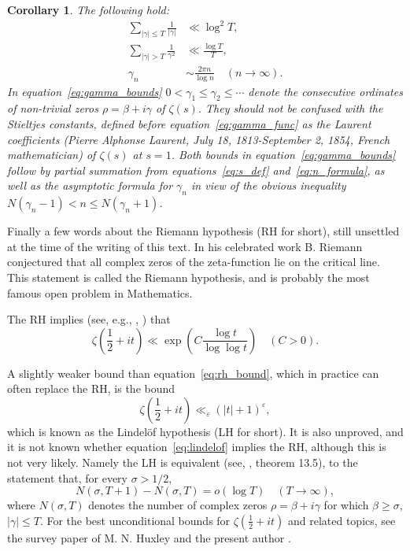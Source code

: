 \documentclass[11pt]{article}
\newtheorem{corollary}[theorem]{Corollary}
\begin{document}
\begin{corollary}\label{cor:gamma_sums}
The following hold:
\begin{align}\label{eq:gamma_bounds}
\sum_{|\gamma| \leq T} \frac{1}{|\gamma|} &\ll \log^2 T, \\
\sum_{|\gamma| > T} \frac{1}{\gamma^2} &\ll \frac{\log T}{T}, \nonumber \\
\gamma_n &\sim \frac{2\pi n}{\log n} \quad (n \to \infty). \nonumber
\end{align}
In equation~\eqref{eq:gamma_bounds} $0 < \gamma_1 \leq \gamma_2 \leq \cdots$ denote the consecutive ordinates of non-trivial zeros $\rho = \beta + i\gamma$ of $\zeta(s)$. They should not be confused with the Stieltjes constants, defined before equation~\eqref{eq:gamma_func} as the Laurent coefficients (Pierre Alphonse Laurent, July 18, 1813-September 2, 1854, French mathematician) of $\zeta(s)$ at $s = 1$. Both bounds in equation~\eqref{eq:gamma_bounds} follow by partial summation from equations~\eqref{eq:s_def} and~\eqref{eq:n_formula}, as well as the asymptotic formula for $\gamma_n$ in view of the obvious inequality $N(\gamma_n - 1) < n \leq N(\gamma_n + 1)$.
\end{corollary}

Finally a few words about the Riemann hypothesis (RH for short), still unsettled at the time of the writing of this text. In his celebrated work \cite{Rie} B. Riemann conjectured that all complex zeros of the zeta-function lie on the critical line. This statement is called the Riemann hypothesis, and is probably the most famous open problem in Mathematics.

The RH implies (see, e.g., \cite{Iv1}, \cite{Tit3}) that
\begin{equation}\label{eq:rh_bound}
\zeta\left(\frac{1}{2} + it\right) \ll \exp\left(C \frac{\log t}{\log \log t}\right) \quad (C > 0).
\end{equation}

A slightly weaker bound than equation~\eqref{eq:rh_bound}, which in practice can often replace the RH, is the bound
\begin{equation}\label{eq:lindelof}
\zeta\left(\frac{1}{2} + it\right) \ll_{\varepsilon} (|t| + 1)^{\varepsilon},
\end{equation}
which is known as the Lindelöf hypothesis (LH for short). It is also unproved, and it is not known whether equation~\eqref{eq:lindelof} implies the RH, although this is not very likely. Namely the LH is equivalent (see, \cite{Tit3}, theorem 13.5), to the statement that, for every $\sigma > 1/2$,
\begin{equation}\label{eq:lh_equivalent}
N(\sigma, T+1) - N(\sigma, T) = o(\log T) \quad (T \to \infty),
\end{equation}
where $N(\sigma, T)$ denotes the number of complex zeros $\rho = \beta + i\gamma$ for which $\beta \geq \sigma$, $|\gamma| \leq T$. For the best unconditional bounds for $\zeta(\frac{1}{2} + it)$ and related topics, see the survey paper of M. N. Huxley and the present author \cite{HuIv}.
\end{document}
